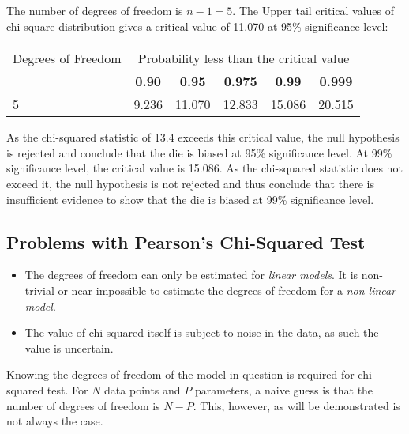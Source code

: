 The number of degrees of freedom is $n - 1 = 5$. The Upper tail critical values
of chi-square distribution gives a critical value of 11.070 at 95\%
significance level:
%
\begin{table}[h]
  \center
  \begin{tabular}{p{1.6cm} | ccccc}
    Degrees of Freedom
    & \multicolumn{5}{c}{Probability less than the critical value} \\
    & \textbf{0.90}
    & \textbf{0.95}
    & \textbf{0.975}
    & \textbf{0.99}
    & \textbf{0.999} \\
    \hline
    5 & 9.236 & 11.070 & 12.833 & 15.086 & 20.515
  \end{tabular}
\end{table}
%
As the chi-squared statistic of 13.4 exceeds this critical value, the null
hypothesis is rejected and conclude that the die is biased at 95\% significance
level. At 99\% significance level, the critical value is 15.086. As the
chi-squared statistic does not exceed it, the null hypothesis
is not rejected and thus conclude that there is insufficient evidence to show
that the die is biased at 99\% significance level.


\subsection{Problems with Pearson's Chi-Squared Test~\cite{Andrae2010}}

\begin{itemize}
  \item{The degrees of freedom can only be estimated for \textit{linear
    models}. It is non-trivial or near impossible to estimate the degrees of
    freedom for a \textit{non-linear model}.}
  \item{The value of chi-squared itself is subject to noise in the data, as
    such the value is uncertain.}
\end{itemize}

Knowing the degrees of freedom of the model in question is required for
chi-squared test. For $N$ data points and $P$ parameters, a naive guess is that
the number of degrees of freedom is $N - P$. This, however, as will be
demonstrated is not always the case.

